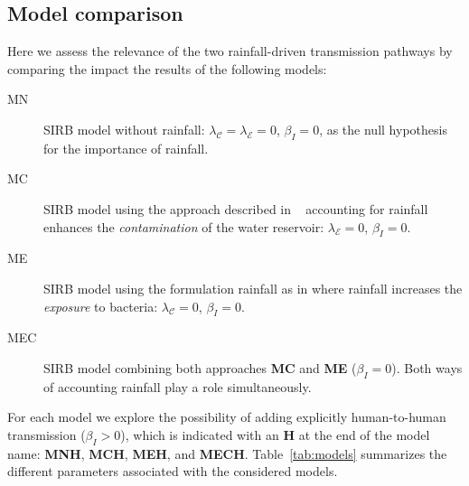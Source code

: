 \subsection{Model comparison}
Here we assess the relevance of the two rainfall-driven transmission pathways by comparing the impact the results of the following models:
\begin{description}
    \item[MN] SIRB model without rainfall: $\lambda_{\mathcal{C}} = \lambda_{\mathcal{E}} = 0$, $\beta_{I} = 0$, as the null hypothesis for the importance of rainfall.
  \item[MC] SIRB model using the approach described in ~\cite{rinaldoReassessment201020112012,bertuzzoProbabilityExtinctionHaiti2016} accounting for rainfall enhances the \textit{contamination} of the water reservoir: $\lambda_{\mathcal{E}} = 0$, $\beta_{I} = 0$. 
  \item[ME] SIRB model using the formulation rainfall as in  \cite{eisenbergExaminingRainfallCholera2013} where rainfall increases the \textit{exposure} to bacteria: $\lambda_{\mathcal{C}} = 0$, $\beta_{I} = 0$. 
  \item[MEC] SIRB model combining both approaches \textbf{MC} and \textbf{ME} ($\beta_{I} = 0$). Both ways of accounting rainfall play a role simultaneously.
\end{description}

 For each model we explore the possibility of adding explicitly human-to-human transmission ($\beta_{I} > 0$), which is indicated with an \textbf{H} at the end of the model name: \textbf{MNH}, \textbf{MCH}, \textbf{MEH}, and \textbf{MECH}. Table~\ref{tab:models} summarizes the different parameters associated with the considered models.

